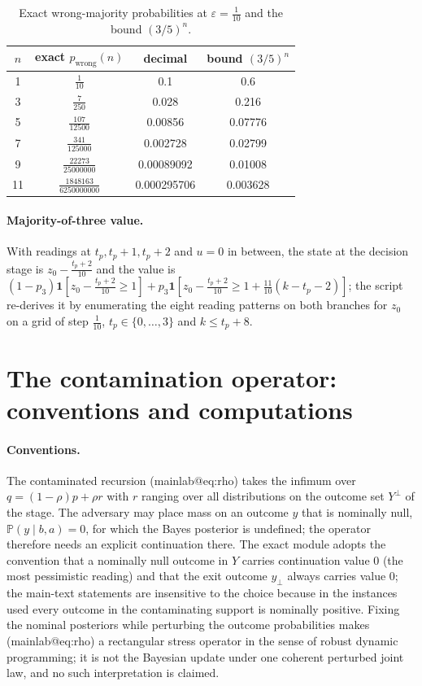 \documentclass[11pt,a4paper]{article}
\makeatletter
\theoremstyle{plain}
\theoremstyle{definition}
\theoremstyle{remark}
\newcommand{\Prob}{\mathbb{P}}
\newcommand{\ind}[1]{\mathbf{1}[#1]}
\newcommand{\tfr}[2]{\tfrac{#1}{#2}}
\newcommand{\mref}[1]{\csname mainlab@#1\endcsname}
\newcommand{\meqref}[1]{(\mref{#1})}
\makeatother
\begin{document}
\begin{table}[h]
\centering\footnotesize
\caption{Exact wrong-majority probabilities at $\varepsilon=\tfr1{10}$ and the bound $(3/5)^n$.}
\label{tab:majority}
\begin{tabular}{@{}c c c c@{}}
\toprule
$n$ & exact $p_{\mathrm{wrong}}(n)$ & decimal & bound $(3/5)^n$\\
\midrule
1 & $\tfrac{1}{10}$ & 0.1 & 0.6\\
3 & $\tfrac{7}{250}$ & 0.028 & 0.216\\
5 & $\tfrac{107}{12500}$ & 0.00856 & 0.07776\\
7 & $\tfrac{341}{125000}$ & 0.002728 & 0.02799\\
9 & $\tfrac{22273}{25000000}$ & 0.00089092 & 0.01008\\
11 & $\tfrac{1848163}{6250000000}$ & 0.000295706 & 0.003628\\
\bottomrule
\end{tabular}
\end{table}

\paragraph{Majority-of-three value.} With readings at $t_p,t_p+1,t_p+2$ and $u=0$ in between, the state at the decision stage is $z_0-\tfr{t_p+2}{10}$ and the value is $(1-p_3)\ind{z_0-\tfr{t_p+2}{10}\ge1}+p_3\ind{z_0-\tfr{t_p+2}{10}\ge1+\tfr{11}{10}(k-t_p-2)}$; the script re-derives it by enumerating the eight reading patterns on both branches for $z_0$ on a grid of step $\tfr1{10}$, $t_p\in\{0,\dots,3\}$ and $k\le t_p+8$.
\section{The contamination operator: conventions and computations}\label{si:contam}

\paragraph{Conventions.} The contaminated recursion \meqref{eq:rho} takes the infimum over $q=(1-\rho)p+\rho r$ with $r$ ranging over all distributions on the outcome set $Y^{\bot}$ of the stage. The adversary may place mass on an outcome $y$ that is nominally null, $\Prob(y\mid b,a)=0$, for which the Bayes posterior is undefined; the operator therefore needs an explicit continuation there. The exact module adopts the convention that a nominally null outcome in $Y$ carries continuation value $0$ (the most pessimistic reading) and that the exit outcome $y_\bot$ always carries value $0$; the main-text statements are insensitive to the choice because in the instances used every outcome in the contaminating support is nominally positive. Fixing the nominal posteriors while perturbing the outcome probabilities makes \meqref{eq:rho} a rectangular stress operator in the sense of robust dynamic programming; it is not the Bayesian update under one coherent perturbed joint law, and no such interpretation is claimed.
\end{document}
